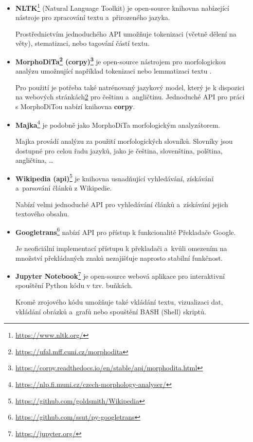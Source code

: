 \begin{itemize}
    \item \textbf{NLTK}\footnote{\url{https://www.nltk.org/}}
    (Natural Language Toolkit) je open-source knihovna nabízející nástroje pro zpracování textu a~přirozeného jazyka.\par Prostřednictvím jednoduchého API umožňuje tokenizaci (včetně dělení na věty), stematizaci, nebo tagování částí textu. 
    
    \item \textbf{MorphoDiTa\footnote{\label{note9}\url{https://ufal.mff.cuni.cz/morphodita}} (corpy)\footnote{\url{https://corpy.readthedocs.io/en/stable/api/morphodita.html}}}
    je open-source nástrojem pro morfologickou analýzu umožnující například tokenizaci nebo lemmatizaci textu \cite{morphodita}.\par
    Pro použití je potřeba také natrénovaný jazykový model, který je k dispozici na webových stránkách\cref{note9} pro češtinu a~angličtinu. Jednoduché API pro práci s MorphoDiTou nabízí knihovna \textbf{corpy}.
    
    \item \textbf{Majka}\footnote{\url{https://nlp.fi.muni.cz/czech-morphology-analyser/}}
    \cite{Majka} je podobně jako MorphoDiTa morfologickým analyzátorem.\par Majka provádí analýzu za použití morfologických slovníků. Slovníky jsou dostupné pro celou řadu jazyků, jako je čeština, slovenština, polština, angličtina, \dots
    
    \item \textbf{Wikipedia (api)}\footnote{\url{https://github.com/goldsmith/Wikipedia}}
    je knihovna usnadňující vyhledávání, získávání a~parsování článků z Wikipedie. \par Nabízí velmi jednoduché API pro vyhledávání článků a~získávání jejich textového obsahu.
    
    \item \textbf{Googletrans}\footnote{\url{https://github.com/ssut/py-googletrans}}
    nabízí API pro přístup k funkcionalitě Překladače Google. \par
    Je neoficiální implementací přístupu k překladači a~kvůli omezením na množství překládaných znaků nezajišťuje naprosto stabilní funkčnost.
    
    \item \textbf{Jupyter Notebook}\footnote{\url{https://jupyter.org/}} 
    je open-source webová aplikace pro interaktivní spouštění Python kódu v tzv. buňkách.\par
    Kromě zrojového kódu umožňuje také vkládání textu, vizualizaci dat, vkládání obrázků a~grafů nebo spouštění BASH (Shell) skriptů.
    

\end{itemize}
